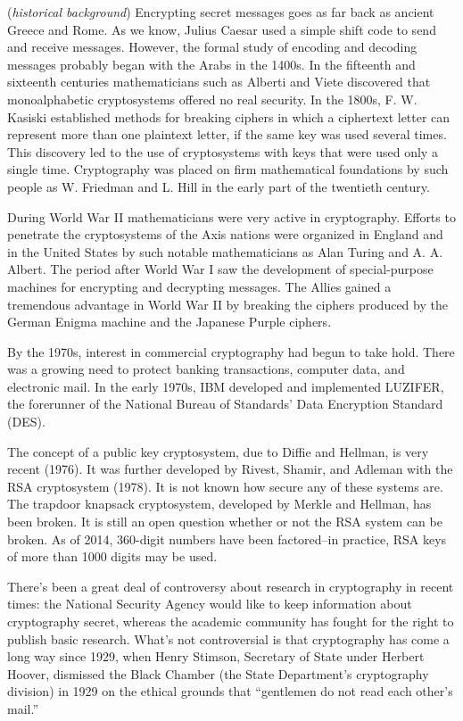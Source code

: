  
\begin{rem} (\emph{historical background})   Encrypting secret messages goes as far back as ancient Greece and
Rome. As we know, Julius Caesar used a simple shift code to send and
receive messages. However, the formal study of  encoding and decoding
messages probably began with the Arabs in the 1400s. In the fifteenth
and sixteenth centuries mathematicians such as Alberti and Viete
discovered 
that monoalphabetic cryptosystems offered no real security. In the
1800s, F. W. Kasiski established methods for breaking ciphers in
which a ciphertext letter can represent more than one plaintext
letter, if the same key was used several times. This discovery led to
the use of cryptosystems with keys that were used only a single time.
Cryptography was placed on firm mathematical foundations by such people
as W. Friedman and L. Hill in the early part of the twentieth century.
 
 
During World War II mathematicians were very active in cryptography.
Efforts to penetrate the cryptosystems of the Axis nations were 
organized in England and in the United States by such notable
mathematicians as Alan Turing and A. A. Albert. The period after
World War I saw the development of special-purpose machines for
encrypting and decrypting messages. The Allies gained a 
tremendous advantage in World War II by breaking the ciphers produced by 
the German Enigma machine and the Japanese Purple ciphers.
 
 
By the 1970s, interest in commercial cryptography had begun to take
hold. There was a growing need to protect banking transactions,
computer data, and electronic mail. In the early 1970s, IBM developed
and implemented LUZIFER, the forerunner  of the National Bureau of
Standards' Data Encryption Standard (DES). 
 
 
The concept of a public key cryptosystem, due to Diffie and Hellman,
is very recent (1976). It was further developed by Rivest,  
Shamir, and Adleman with the RSA cryptosystem (1978). It is not known
how secure any of these systems are. The trapdoor knapsack
cryptosystem, developed by Merkle and Hellman, has been broken. It is
still an open question whether or not the RSA system can be broken. As of 2014, 360-digit numbers 
have been factored--in practice, RSA keys of more than 1000 digits may be used.

There's been a great deal of controversy about research in
cryptography in recent times: the National Security Agency would like to
keep information about cryptography secret, whereas the academic community
has fought for the right to publish basic research.   
What's not controversial is that cryptography has come a long way since 1929, when Henry Stimson, 
Secretary of State under Herbert Hoover, dismissed the Black Chamber
(the State Department's cryptography division) in 1929 on the ethical 
grounds that ``gentlemen do not read each other's mail.''
\end{rem} 
 
